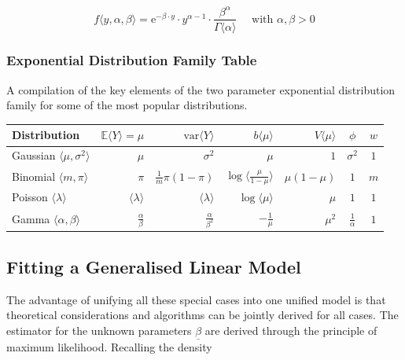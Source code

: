 \documentclass[11pt]{article}
\begin{document}
\begin{equation*}
	f\langle y, \alpha, \beta\rangle = \text{e}^{-\beta\cdot y} \cdot y^{\alpha - 1} \cdot \frac{\beta^\alpha}{\Gamma\langle\alpha\rangle}\quad\text{ with } \alpha,\beta > 0
\end{equation*}

\subsubsection{Exponential Distribution Family Table}
A compilation of the key elements of the two parameter exponential distribution family for some of the most popular distributions.

\vspace{1em}

\begin{minipage}{\textwidth}
	\renewcommand{\arraystretch}{1.5}
	\begin{tabularx}{\textwidth}{|p{4cm}||r r| r r C C|}
		\hline
		\textbf{Distribution} & $\mathbb{E}\langle Y\rangle=\mu$ & $\text{var}\langle Y \rangle$ & $b\langle \mu \rangle$ & $V\langle \mu \rangle$ & $\phi$ & $w$ \\
		\hline
		Gaussian $\langle\mu,\sigma^2\rangle$ & $\mu$ & $ \sigma^2 $ & $ \mu $ & $ 1 $ & $ \sigma^2 $ & $1$\\
		Binomial $\langle m,\pi \rangle$ & $\pi$ & $\frac{1}{m} \pi (1-\pi) $ & $\log\langle \frac{\mu}{1-\mu} \rangle$ & $\mu(1-\mu)$ & $1$ & $m$\\
		Poisson $\langle \lambda \rangle$ & $\langle \lambda \rangle$ & $\langle \lambda \rangle$ & $\log\langle\mu\rangle $ & $\mu$ & $1$ & $1$ \\
		Gamma $\langle \alpha,\beta \rangle$ & $\frac{\alpha}{\beta}$ & $\frac{\alpha}{\beta^2}$ & $- \frac{1}{\mu}$ & $\mu^2$ & $\frac{1}{\alpha}$ & $1$ \\
		\hline
	\end{tabularx}
\end{minipage}

\subsection{Fitting a Generalised Linear Model}

The advantage of unifying all these special cases into one unified model is that theoretical considerations and algorithms can be jointly derived for all cases. The estimator for the unknown parameters $\underline{\beta}$ are derived through the principle of maximum likelihood. Recalling the density
\end{document}
